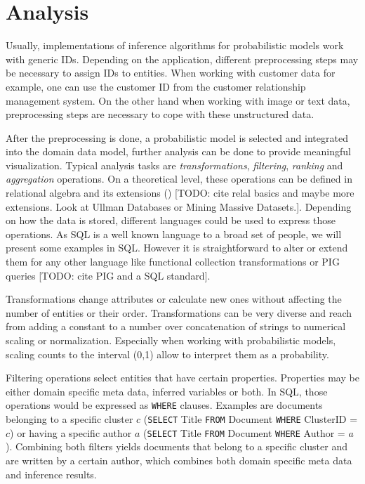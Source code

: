 \section{Analysis}

Usually, implementations of inference algorithms for probabilistic models work with generic IDs. Depending on the application, different preprocessing steps may be necessary to assign IDs to entities. When working with customer data for example, one can use the customer ID from the customer relationship management system. On the other hand when working with image or text data, preprocessing steps are necessary to cope with these unstructured data.

After the preprocessing is done, a probabilistic model is selected and integrated into the domain data model, further analysis can be done to provide meaningful visualization. Typical analysis tasks are \emph{transformations}, \emph{filtering}, \emph{ranking} and \emph{aggregation} operations. On a theoretical level, these operations can be defined in relational algebra and its extensions (\cite{ozsoyouglu1987extending, klug1982equivalence}) [TODO: cite relal basics and maybe more extensions. Look at Ullman Databases or Mining Massive Datasets.]. Depending on how the data is stored, different languages could be used to express those operations. As SQL is a well known language to a broad set of people, we will present some examples in SQL. However it is straightforward to alter or extend them for any other language like functional collection transformations or PIG queries [TODO: cite PIG and a SQL standard].

Transformations change attributes or calculate new ones without affecting the number of entities or their order. Transformations can be very diverse and reach from adding a constant to a number over concatenation of strings to numerical scaling or normalization. Especially when working with probabilistic models, scaling counts to the interval (0,1) allow to interpret them as a probability.

Filtering operations select entities that have certain properties. Properties may be either domain specific meta data, inferred variables or both. In SQL, those operations would be expressed as \texttt{WHERE} clauses. Examples are documents belonging to a specific cluster $c$ (\texttt{SELECT} Title \texttt{FROM} Document \texttt{WHERE} ClusterID = $c$) or having a specific author $a$ (\texttt{SELECT} Title \texttt{FROM} Document \texttt{WHERE} Author = $a$). Combining both filters yields documents that belong to a specific cluster and are written by a certain author, which combines both domain specific meta data and inference results.

